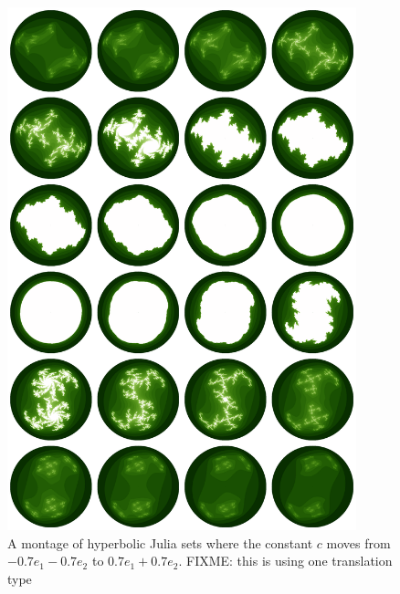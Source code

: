 \begin{figure}[p]
\centering
\includegraphics[width=0.9\textwidth]{julia_montage}
\caption{\label{fig:julia_montage} 
  A montage of hyperbolic Julia sets where the constant $c$ moves from $-0.7e_1 - 0.7e_2$
  to $0.7e_1 + 0.7e_2$. FIXME: this is using one translation type
}
\end{figure}

